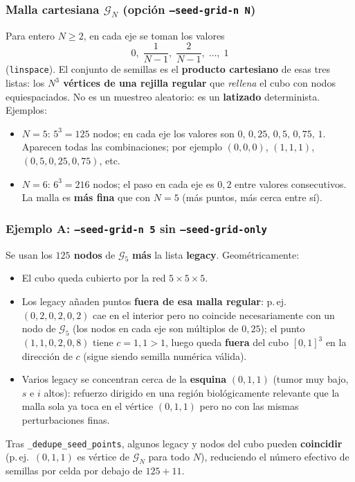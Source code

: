 \documentclass[11pt,a4paper]{article}
\begin{document}
\subsubsection*{Malla cartesiana $\mathcal{G}_N$ (opción \texttt{--seed-grid-n N})}

Para entero $N\geq 2$, en cada eje se toman los valores
\[
0,\;\frac{1}{N-1},\;\frac{2}{N-1},\;\ldots,\;1
\]
(\texttt{linspace}). El conjunto de semillas es el \textbf{producto cartesiano} de esas tres listas: los \textbf{$N^3$ vértices de una rejilla regular} que \emph{rellena} el cubo con nodos equiespaciados. No es un muestreo aleatorio: es un \textbf{latizado} determinista. Ejemplos:
\begin{itemize}[leftmargin=*]
  \item $N=5$: $5^3=125$ nodos; en cada eje los valores son $0,\,0{,}25,\,0{,}5,\,0{,}75,\,1$. Aparecen todas las combinaciones; por ejemplo $(0,0,0)$, $(1,1,1)$, $(0{,}5,0{,}25,0{,}75)$, etc.
  \item $N=6$: $6^3=216$ nodos; el paso en cada eje es $0{,}2$ entre valores consecutivos. La malla es \textbf{más fina} que con $N=5$ (más puntos, más cerca entre sí).
\end{itemize}

\subsubsection*{Ejemplo A: \texttt{--seed-grid-n 5} sin \texttt{--seed-grid-only}}

Se usan los \textbf{$125$ nodos} de $\mathcal{G}_5$ \textbf{más} la lista \textbf{legacy}. Geométricamente:
\begin{itemize}[leftmargin=*]
  \item El cubo queda cubierto por la red $5\times 5\times 5$.
  \item Los legacy añaden puntos \textbf{fuera de esa malla regular}: p.\,ej.\ $(0{,}2,0{,}2,0{,}2)$ cae en el interior pero no coincide necesariamente con un nodo de $\mathcal{G}_5$ (los nodos en cada eje son múltiplos de $0{,}25$); el punto $(1{,}1,0{,}2,0{,}8)$ tiene $c=1{,}1>1$, luego queda \textbf{fuera} del cubo $[0,1]^3$ en la dirección de $c$ (sigue siendo semilla numérica válida).
  \item Varios legacy se concentran cerca de la \textbf{esquina} $(0,1,1)$ (tumor muy bajo, $s$ e $i$ altos): refuerzo dirigido en una región biológicamente relevante que la malla sola ya toca en el vértice $(0,1,1)$ pero no con las mismas perturbaciones finas.
\end{itemize}
Tras \texttt{\_dedupe\_seed\_points}, algunos legacy y nodos del cubo pueden \textbf{coincidir} (p.\,ej.\ $(0,1,1)$ es vértice de $\mathcal{G}_N$ para todo $N$), reduciendo el número efectivo de semillas por celda por debajo de $125+11$.
\end{document}
